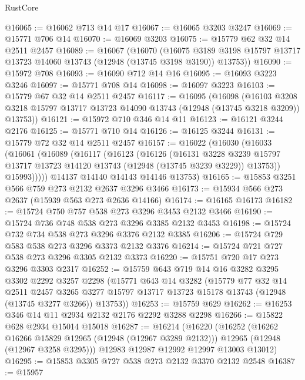 \begin{lexlean}{RustCore}
\begin{coremodule}
@16065 := @16062 @713 @14 @17
@16067 := @16065 @3203 @3247
@16069 := @15771 @706 @14
@16070 := @16069 @3203
@16075 := @15779 @62 @32 @14 @2511 @2457
@16089 := @16067
    (@16070
      (@16075 @3189 @3198 @15797 @13717 @13723 @14060 @13743 (@12948 (@13745 @3198 @3190)) @13753))
@16090 := @15972 @708
@16093 := @16090 @712 @14 @16
@16095 := @16093 @3223 @3246
@16097 := @15771 @708 @14
@16098 := @16097 @3223
@16103 := @15779 @67 @32 @14 @2511 @2457
@16117 := @16095
    (@16098
      (@16103 @3208 @3218 @15797 @13717 @13723 @14090 @13743 (@12948 (@13745 @3218 @3209)) @13753))
@16121 := @15972 @710 @346 @14 @11
@16123 := @16121 @3244 @2176
@16125 := @15771 @710 @14
@16126 := @16125 @3244
@16131 := @15779 @72 @32 @14 @2511 @2457
@16157 := @16022
    (@16030
      (@16033
        (@16061
          (@16089
            (@16117
              (@16123
                (@16126
                  (@16131
                    @3228
                    @3239
                    @15797
                    @13717
                    @13723
                    @14120
                    @13743
                    (@12948 (@13745 @3239 @3229))
                    @13753))
                @15993)))))
      @14137
      @14140
      @14143
      @14146
      @13753)
@16165 := @15853 @3251 @566 @759 @273 @2132 @2637 @3296 @3466
@16173 := @15934 @566 @273 @2637 (@15939 @563 @273 @2636 @14166)
@16174 := @16165 @16173
@16182 := @15724 @750 @757 @538 @273 @3296 @3453 @2132 @3466
@16190 := @15724 @736 @748 @538 @273 @3296 @3385 @2132 @3453
@16198 := @15724 @732 @734 @538 @273 @3296 @3376 @2132 @3385
@16206 := @15724 @729 @583 @538 @273 @3296 @3373 @2132 @3376
@16214 := @15724 @721 @727 @538 @273 @3296 @3305 @2132 @3373
@16220 := @15751 @720 @17 @273 @3296 @3303 @2317
@16252 := @15759
    @643
    @719
    @14
    @16
    @3282
    @3295
    @3302
    @2292
    @3257
    @2298
    (@15771
      @643
      @14
      @3282
      (@15779
        @77
        @32
        @14
        @2511
        @2457
        @3265
        @3277
        @15797
        @13717
        @13723
        @15178
        @13743
        (@12948 (@13745 @3277 @3266))
        @13753))
@16253 := @15759 @629
@16262 := @16253 @346 @14 @11 @2934 @2132 @2176 @2292 @3288 @2298
@16266 := @15822 @628 @2934 @15014 @15018
@16287 := @16214
    (@16220
      (@16252
        (@16262 @16266 @15829 @12965 (@12948 (@12967 @3289 @2132)))
        @12965
        (@12948 (@12967 @3258 @3295)))
      @12983
      @12987
      @12992
      @12997
      @13003
      @13012)
@16295 := @15853 @3305 @727 @538 @273 @2132 @3370 @2132 @2548
@16387 := @15957

\end{coremodule}
\end{lexlean}

